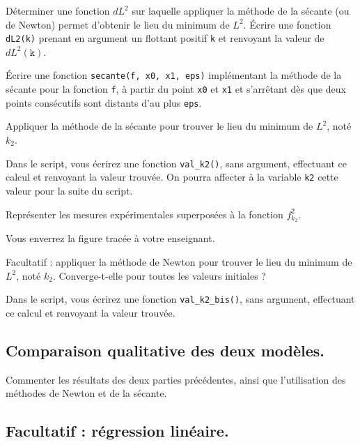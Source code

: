 \question{} Déterminer une fonction $dL^2$ sur laquelle appliquer la méthode de la sécante (ou de Newton) permet d'obtenir le lieu du minimum de $L^2$.
Écrire une fonction \texttt{dL2(k)} prenant en argument un flottant positif \texttt{k} et renvoyant la valeur de $dL^2(\texttt k)$.

\medskip{}

\question{}\'Ecrire une fonction \texttt{secante(f, x0, x1, eps)} implémentant la méthode de la sécante pour la fonction \texttt{f}, à partir du point \texttt{x0} et \texttt{x1} et s'arrêtant dès que deux points consécutifs sont distants d'au plus \texttt{eps}.

\medskip{}  

 
\question{} Appliquer la méthode de la sécante pour trouver le lieu du minimum de $L^2$, noté $k_2$. 

Dans le script, vous écrirez une fonction \texttt{val\_k2()}, sans argument, effectuant ce calcul et renvoyant la valeur trouvée. On pourra affecter à la variable \texttt{k2} cette valeur pour la suite du script.

\medskip{}

\question{\label{qu:tracef2}} Représenter les mesures expérimentales superposées à la fonction $f^2_{k_2}$.

  Vous enverrez la figure tracée à votre enseignant. 


\medskip{}  
 
\question{} Facultatif : appliquer la méthode de Newton pour trouver le lieu du minimum de $L^2$, noté $k_2$. Converge-t-elle pour toutes les valeurs initiales ?

Dans le script, vous écrirez une fonction \texttt{val\_k2\_bis()}, sans argument, effectuant ce calcul et renvoyant la valeur trouvée. 


\subsection{Comparaison qualitative des deux modèles.}


\question{} Commenter les résultats des deux parties précédentes, ainsi que l'utilisation des méthodes de Newton et de la sécante.


\subsection{Facultatif : régression linéaire.}
\label{sec.papl.reglin}

